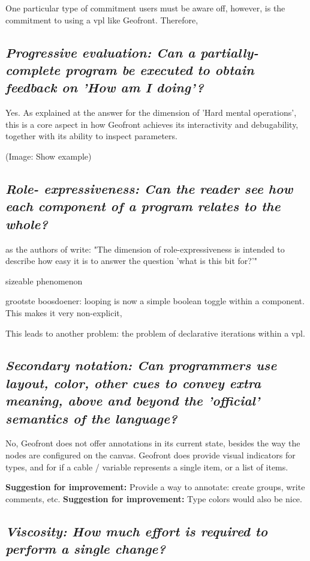 One particular type of commitment users must be aware off, however, is the commitment to using a \ac{vpl} like Geofront. 
Therefore, 


\subsection*{\emph{Progressive evaluation: Can a partially-complete program be executed to obtain feedback on 'How am I doing'? }}

Yes. 
As explained at the answer for the dimension of 'Hard mental operations', this is a core aspect in how Geofront achieves its interactivity and debugability, together with its ability to inspect parameters. 

(Image: Show example)

\subsection*{\emph{Role- expressiveness: Can the reader see how each component of a program relates to the whole? }}

as the authors of \cite[]{green_usability_1996} write: "The dimension of role-expressiveness is intended to describe how easy it is to answer the question 'what is this bit for?'"

sizeable phenomenon

grootste boosdoener: looping is now a simple boolean toggle within a component. 
This makes it very non-explicit, 

This leads to another problem: the problem of declarative iterations within a vpl. 


\subsection*{\emph{Secondary notation: Can programmers use layout, color, other cues to convey extra meaning, above and beyond the 'official' semantics of the language? }}

No, Geofront does not offer annotations in its current state, besides the way the nodes are configured on the canvas.  
Geofront does provide visual indicators for types, and for if a cable / variable represents a single item, or a list of items.

\textbf{Suggestion for improvement:} Provide a way to annotate: create groups, write comments, etc. 
\textbf{Suggestion for improvement:} Type colors would also be nice.

\subsection*{\emph{Viscosity: How much effort is required to perform a single change? }}

